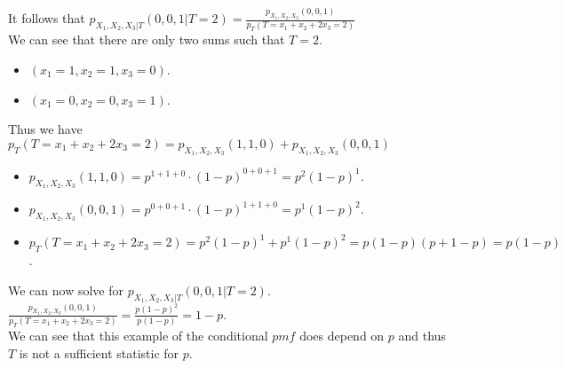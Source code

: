 \documentclass[12pt]{article}
\newcommand{\XB}{\color{black}}
\newcommand{\XV}{\color{violet}}
\begin{document}
\noindent 
It follows that $ \displaystyle p_{X_{1}, X_{2}, X_{3} | T}(0, 0, 1 | T = 2) = \frac{p_{X_{1}, X_{2}, X_{3}}(0, 0, 1)}{p_{T}(T = x_{1} + x_{2} + 2x_{3} = 2)} $ \\

\noindent
We can see that there are only two sums such that $ T = 2 $. 
\begin{itemize}
    \item $ (x_{1} = 1, x_{2} = 1, x_{3} = 0) $.
    \item $ (x_{1} = 0, x_{2} = 0, x_{3} = 1) $.
\end{itemize}

\noindent
Thus we have $ p_{T}(T = x_{1} + x_{2} + 2x_{3} = 2) = p_{X_{1}, X_{2}, X_{3}}(1, 1, 0) + p_{X_{1}, X_{2}, X_{3}}(0, 0, 1) $
\begin{itemize}
    \item $ p_{X_{1}, X_{2}, X_{3}}(1, 1, 0) = p^{1 + 1 + 0} \cdot (1 - p)^{0 + 0 + 1} = p^{2}(1 - p)^{1} $.
    \item $ p_{X_{1}, X_{2}, X_{3}}(0, 0, 1) = p^{0 + 0 + 1} \cdot (1 - p)^{1 + 1 + 0} = p^{1}(1 - p)^{2} $.
    \item $ p_{T}(T = x_{1} + x_{2} + 2x_{3} = 2) = p^{2}(1 - p)^{1} + p^{1}(1 - p)^{2} = p(1 - p)(p + 1 - p) = p(1 - p) $.
\end{itemize}

\noindent
We can now solve for $ p_{X_{1}, X_{2}, X_{3} | T}(0, 0, 1 | T = 2) $. \\ 

$ \displaystyle \frac{p_{X_{1}, X_{2}, X_{3}}(0, 0, 1)}{p_{T}(T = x_{1} + x_{2} + 2x_{3} = 2)} = \frac{p(1 - p)^{2}}{p(1 - p)} = 1 - p $. \\

\noindent
We can see that this example of the conditional $ pmf $ does depend on $ p $ and thus $ T $ is not a sufficient statistic for $ p $.

\end{document}
